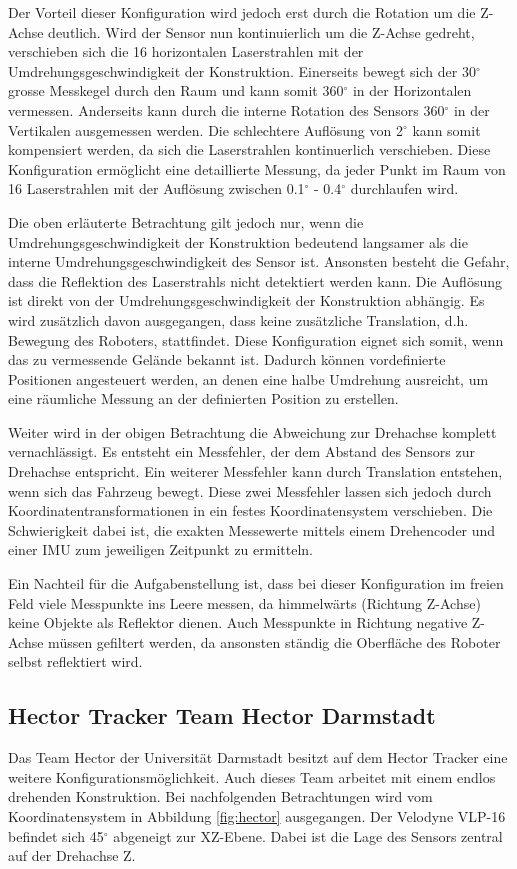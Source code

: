 Der Vorteil dieser Konfiguration wird jedoch erst durch die Rotation um die Z-Achse deutlich. Wird der Sensor nun kontinuierlich um die Z-Achse gedreht, verschieben sich die 16 horizontalen Laserstrahlen mit der Umdrehungsgeschwindigkeit der Konstruktion. Einerseits bewegt sich der 30$^\circ$ grosse Messkegel durch den Raum und kann somit 360$^\circ$ in der Horizontalen vermessen. Anderseits kann durch die interne Rotation des Sensors 360$^\circ$  in der Vertikalen ausgemessen werden. Die schlechtere Auflösung von 2$^\circ$ kann somit kompensiert werden, da sich die Laserstrahlen kontinuerlich verschieben. Diese Konfiguration ermöglicht eine detaillierte Messung, da jeder Punkt im Raum von 16 Laserstrahlen mit der Auflösung zwischen 0.1$^\circ$ - 0.4$^\circ$ durchlaufen wird. 

Die oben erläuterte Betrachtung gilt jedoch nur, wenn die Umdrehungsgeschwindigkeit der Konstruktion bedeutend langsamer als die interne Umdrehungsgeschwindigkeit des Sensor ist. Ansonsten besteht die Gefahr, dass die Reflektion des Laserstrahls nicht detektiert werden kann. Die Auflösung ist direkt von der Umdrehungsgeschwindigkeit der Konstruktion abhängig. Es wird zusätzlich davon ausgegangen, dass keine zusätzliche Translation, d.h. Bewegung des Roboters, stattfindet. Diese Konfiguration eignet sich somit, wenn das zu vermessende Gelände bekannt ist. Dadurch können vordefinierte Positionen angesteuert werden, an denen eine halbe Umdrehung ausreicht, um eine räumliche Messung an der definierten Position zu erstellen. 

Weiter wird in der obigen Betrachtung die Abweichung zur Drehachse komplett vernachlässigt. Es entsteht ein Messfehler, der dem Abstand des Sensors zur Drehachse entspricht. Ein weiterer Messfehler kann durch Translation entstehen, wenn sich das Fahrzeug bewegt. Diese zwei Messfehler lassen sich jedoch durch Koordinatentransformationen in ein festes Koordinatensystem verschieben. Die Schwierigkeit dabei ist, die exakten Messewerte mittels einem Drehencoder und einer \ac{IMU} zum jeweiligen Zeitpunkt zu ermitteln. 

Ein Nachteil für die Aufgabenstellung ist, dass bei dieser Konfiguration im freien Feld viele Messpunkte ins Leere messen, da himmelwärts (Richtung Z-Achse) keine Objekte als Reflektor dienen. Auch Messpunkte in Richtung negative Z-Achse müssen gefiltert werden, da ansonsten ständig die Oberfläche des Roboter selbst reflektiert wird.

\subsection{Hector Tracker Team Hector Darmstadt}
 \label{subsec:hector}
Das Team Hector der Universität Darmstadt besitzt auf dem Hector Tracker eine weitere Konfigurationsmöglichkeit. Auch dieses Team arbeitet mit einem endlos drehenden Konstruktion. Bei nachfolgenden Betrachtungen wird vom Koordinatensystem in Abbildung \ref{fig:hector} ausgegangen. Der Velodyne VLP-16 befindet sich 45$^\circ$ abgeneigt zur XZ-Ebene. Dabei ist die Lage des Sensors zentral auf der Drehachse Z.


